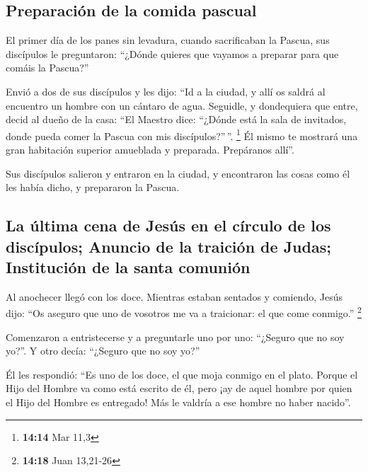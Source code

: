 \hypertarget{preparaciuxf3n-de-la-comida-pascual}{%
\subsection{Preparación de la comida
pascual}\label{preparaciuxf3n-de-la-comida-pascual}}

 El primer día de los panes sin levadura, cuando
sacrificaban la Pascua, sus discípulos le preguntaron: ``¿Dónde quieres
que vayamos a preparar para que comáis la Pascua?''

 Envió a dos de sus discípulos y les dijo: ``Id a la
ciudad, y allí os saldrá al encuentro un hombre con un cántaro de agua.
Seguidle,  y dondequiera que entre, decid al dueño de la
casa: ``El Maestro dice: ``¿Dónde está la sala de invitados, donde pueda
comer la Pascua con mis discípulos?''\,''. \footnote{\textbf{14:14} Mar
  11,3}  Él mismo te mostrará una gran habitación
superior amueblada y preparada. Prepáranos allí''.

 Sus discípulos salieron y entraron en la ciudad, y
encontraron las cosas como él les había dicho, y prepararon la Pascua.

\hypertarget{la-uxfaltima-cena-de-jesuxfas-en-el-cuxedrculo-de-los-discuxedpulos-anuncio-de-la-traiciuxf3n-de-judas-instituciuxf3n-de-la-santa-comuniuxf3n}{%
\subsection{La última cena de Jesús en el círculo de los discípulos;
Anuncio de la traición de Judas; Institución de la santa
comunión}\label{la-uxfaltima-cena-de-jesuxfas-en-el-cuxedrculo-de-los-discuxedpulos-anuncio-de-la-traiciuxf3n-de-judas-instituciuxf3n-de-la-santa-comuniuxf3n}}

 Al anochecer llegó con los doce. 
Mientras estaban sentados y comiendo, Jesús dijo: ``Os aseguro que uno
de vosotros me va a traicionar: el que come conmigo.'' \footnote{\textbf{14:18}
  Juan 13,21-26}

 Comenzaron a entristecerse y a preguntarle uno por uno:
``¿Seguro que no soy yo?''. Y otro decía: ``¿Seguro que no soy yo?''

 Él les respondió: ``Es uno de los doce, el que moja
conmigo en el plato.  Porque el Hijo del Hombre va como
está escrito de él, pero ¡ay de aquel hombre por quien el Hijo del
Hombre es entregado! Más le valdría a ese hombre no haber nacido''.

